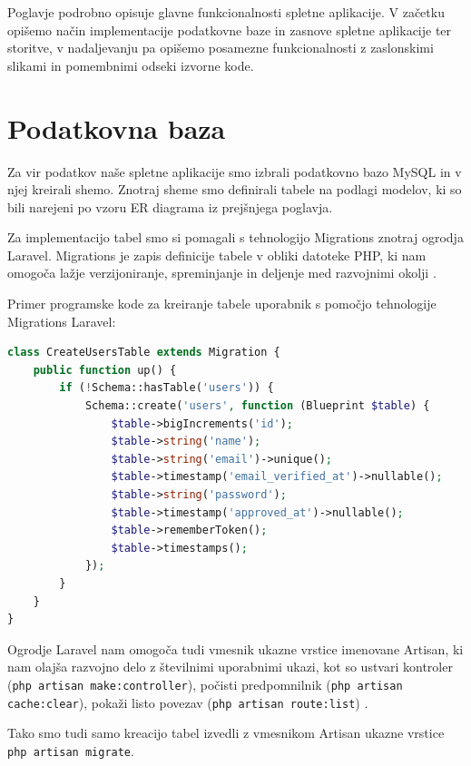 \documentclass[a4paper, 12pt]{book}
\begin{document}
Poglavje podrobno opisuje glavne funkcionalnosti spletne aplikacije. V začetku opišemo način implementacije podatkovne baze in zasnove spletne aplikacije ter storitve, v nadaljevanju pa opišemo posamezne funkcionalnosti z zaslonskimi slikami in pomembnimi odseki izvorne kode.


\section{Podatkovna baza}

Za vir podatkov naše spletne aplikacije smo izbrali podatkovno bazo MySQL in v njej kreirali shemo. Znotraj sheme smo definirali tabele na podlagi modelov, ki so bili narejeni po vzoru ER diagrama iz prejšnjega poglavja.
 
Za implementacijo tabel smo si pomagali s tehnologijo Migrations znotraj ogrodja Laravel. Migrations je zapis definicije tabele v obliki datoteke PHP, ki nam omogoča lažje verzijoniranje, spreminjanje in deljenje med razvojnimi okolji \cite{laravel-migrations}.

\clearpage

Primer programske kode za kreiranje tabele uporabnik s pomočjo tehnologije Migrations Laravel:

\begin{lstlisting}[language=PHP, style=mystyle]
class CreateUsersTable extends Migration {
    public function up() {
        if (!Schema::hasTable('users')) {
            Schema::create('users', function (Blueprint $table) {
                $table->bigIncrements('id');
                $table->string('name');
                $table->string('email')->unique();
                $table->timestamp('email_verified_at')->nullable();
                $table->string('password');
                $table->timestamp('approved_at')->nullable();
                $table->rememberToken();
                $table->timestamps();
            });
        }
    }
}
\end{lstlisting}

Ogrodje Laravel nam omogoča tudi vmesnik ukazne vrstice imenovane Artisan, ki nam olajša razvojno delo z številnimi uporabnimi ukazi, kot so ustvari kontroler (\verb=php artisan make:controller=), počisti predpomnilnik (\verb=php artisan cache:clear=), pokaži listo povezav (\verb=php artisan route:list=) \cite{laravel-artisan}.

Tako smo tudi samo kreacijo tabel izvedli z vmesnikom Artisan ukazne vrstice \verb=php artisan migrate=.
\end{document}
